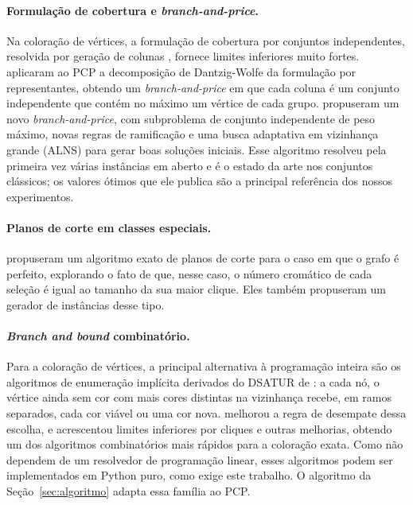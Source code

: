 \documentclass[12pt]{article}
\begin{document}
\paragraph{Formulação de cobertura e \emph{branch-and-price}.} Na coloração
de vértices, a formulação de cobertura por conjuntos independentes, resolvida
por geração de colunas \cite{mehrotra1996}, fornece limites inferiores muito
fortes. \cite{hoshino2011} aplicaram ao PCP a decomposição de Dantzig-Wolfe da
formulação por representantes, obtendo um \emph{branch-and-price} em que cada
coluna é um conjunto independente que contém no máximo um vértice de cada
grupo. \cite{furini2018} propuseram um novo \emph{branch-and-price}, com
subproblema de conjunto independente de peso máximo, novas regras de
ramificação e uma busca adaptativa em vizinhança grande (ALNS) para gerar boas
soluções iniciais. Esse algoritmo resolveu pela primeira vez várias instâncias
em aberto e é o estado da arte nos conjuntos clássicos; os valores ótimos que
ele publica são a principal referência dos nossos experimentos.

\paragraph{Planos de corte em classes especiais.} \cite{seker2021}
propuseram um algoritmo exato de planos de corte para o caso em que o grafo é
perfeito, explorando o fato de que, nesse caso, o número cromático de cada
seleção é igual ao tamanho da sua maior clique. Eles também propuseram um
gerador de instâncias desse tipo.

\paragraph{\emph{Branch and bound} combinatório.} Para a coloração de
vértices, a principal alternativa à programação inteira são os algoritmos de
enumeração implícita derivados do DSATUR de \cite{brelaz1979}: a cada nó, o
vértice ainda sem cor com mais cores distintas na vizinhança recebe, em ramos
separados, cada cor viável ou uma cor nova. \cite{sewell1996} melhorou a regra
de desempate dessa escolha, e \cite{sansegundo2012} acrescentou limites
inferiores por cliques e outras melhorias, obtendo um dos algoritmos
combinatórios mais rápidos para a coloração exata. Como não dependem de
um resolvedor de programação linear, esses algoritmos podem ser implementados
em Python puro, como exige este trabalho. O algoritmo da
Seção~\ref{sec:algoritmo} adapta essa família ao PCP.
\end{document}
